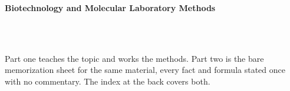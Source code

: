 



\makeindex[title={Index of This Volume},columns=2,intoc]

\begin{titlepage}\thispagestyle{empty}
\vspace*{0.14\textheight}
\noindent{\color{tiercore}\rule{\textwidth}{5pt}}\\[3pt]
\noindent{\color{bioline}\rule{\textwidth}{1pt}}\\[26pt]
\\[12pt]
\noindent\begin{minipage}{\textwidth}\raggedright
{\sffamily\bfseries\fontsize{28}{32}\selectfont\color{bioink}%
 \hyphenchar{} Biotechnology and Molecular Laboratory Methods\par}\end{minipage}\\[16pt]
\noindent{\color{biogreen}\rule{\textwidth}{1.4pt}}\\[10pt]
\noindent\begin{minipage}{\textwidth}\raggedright
{\fontsize{10.5}{14}\selectfont\color{biogreen}%
Part one teaches the topic and works the methods. Part two is the bare memorization sheet for the
same material, every fact and formula stated once with no commentary. The index at the back covers both.\par}\end{minipage}
\vfill
\noindent{\color{bioline}\rule{\textwidth}{1pt}}\\[3pt]
\noindent{\color{tiercore}\rule{\textwidth}{5pt}}
\end{titlepage}
\tableofcontents
\clearpage
{}
\clearpage
\printindex

